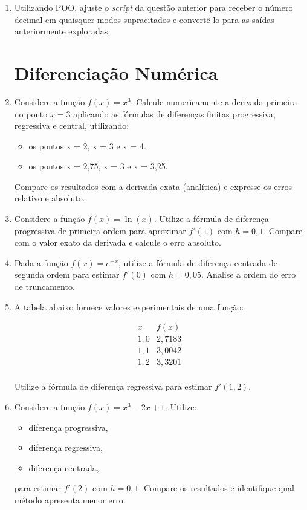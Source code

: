 \begin{enumerate}
\item Utilizando POO, ajuste o {\it script} da questão anterior para receber o número decimal em quaisquer modos supracitados e convertê-lo para as saídas 
    anteriormente exploradas.
    
\section{Diferenciação Numérica} \label{sec:diferenciação}

\item  Considere a função $f(x) = x^3$. Calcule numericamente a derivada primeira no ponto $x = 3$ aplicando as
fórmulas de diferenças finitas progressiva, regressiva e central, utilizando:
\begin{itemize}
    \item os pontos x = 2, x = 3 e x = 4.
    \item os pontos x = 2,75, x = 3 e x = 3,25.
\end{itemize} 
Compare os resultados com a derivada exata (analítica) e expresse os erros relativo e absoluto.


\item Considere a função $f(x) = \ln(x)$. 
Utilize a fórmula de diferença progressiva de primeira ordem para aproximar $f'(1)$ com $h = 0{,}1$. 
Compare com o valor exato da derivada e calcule o erro absoluto.

\item Dada a função $f(x) = e^{-x}$, utilize a fórmula de diferença centrada de segunda ordem para estimar $f'(0)$ com $h = 0{,}05$. 
Analise a ordem do erro de truncamento.

\item A tabela abaixo fornece valores experimentais de uma função:

\[
\begin{array}{c|c}
x & f(x) \\
\hline
1{,}0 & 2{,}7183 \\
1{,}1 & 3{,}0042 \\
1{,}2 & 3{,}3201 \\
\end{array}
\]

Utilize a fórmula de diferença regressiva para estimar $f'(1{,}2)$.

\item Considere a função $f(x) = x^3 - 2x + 1$. 
Utilize:
\begin{itemize}
\item diferença progressiva,
\item diferença regressiva,
\item diferença centrada,
\end{itemize}
para estimar $f'(2)$ com $h = 0{,}1$. 
Compare os resultados e identifique qual método apresenta menor erro.


\end{enumerate}
